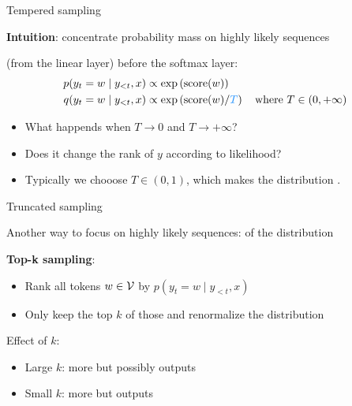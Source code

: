 \documentclass[usenames,dvipsnames,notes,11pt,aspectratio=169,hyperref={colorlinks=true, linkcolor=blue}]{beamer}
\begin{document}
\begin{frame}
    {Tempered sampling}

    \textbf{Intuition}: concentrate probability mass on highly likely sequences 

     (from the linear layer) before the softmax layer:\\
    \begin{align*}
        p(y_t=w \mid y_{<t},x) &\propto \exp\p{\mathrm{score}(w)}\\
        q(y_t=w \mid y_{<t}, x) &\propto \exp\p{\mathrm{score}(w)/{\color{blue}T}} 
        \quad \text{where } T\in(0, +\infty)
    \end{align*}
    \pause
    \vspace{-2em}
    \begin{itemize}
        \item What happends when $T\to 0$ and $T\to +\infty$?
        \item Does it change the rank of $y$ according to likelihood?
        \item Typically we chooose $T\in (0, 1)$, which makes the distribution .
    \end{itemize}
\end{frame}

\begin{frame}
    {Truncated sampling}

    Another way to focus on highly likely sequences:  of the distribution

    \textbf{Top-k sampling}:\\
    \begin{itemize}
        \item Rank all tokens $w\in\mathcal{V}$ by $p(y_t=w\mid y_{<t},x)$
        \item Only keep the top $k$ of those and renormalize the distribution
    \end{itemize}

    Effect of $k$:\\
    \begin{itemize}
        \item Large $k$: more  but possibly  outputs
        \item Small $k$: more  but  outputs
    \end{itemize}
\end{frame}
\end{document}
